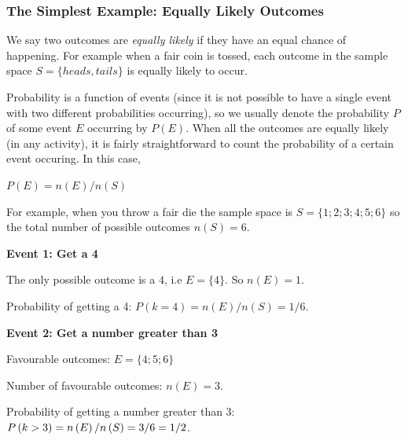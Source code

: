             \subsubsection{ The Simplest Example: Equally Likely Outcomes}
            \nopagebreak
         \label{m39377*eip-953}We say two outcomes are \textsl{equally likely} if they have an equal chance of
happening. For example when a fair coin is tossed, each outcome in the sample
space $S=\{heads,tails\}$ is equally likely to occur.\par \label{m39377*eip-594}Probability is a function of events (since it is not possible to have a single event with two different probabilities occurring), so we usually denote the probability $P$ of some event $E$ occurring by $P\left(E\right)$. When all the outcomes are equally likely (in any
activity), it is fairly straightforward to count the probability of a certain
event occuring. In this case,\par \label{m39377*eip-56}$P\left(E\right)=n\left(E\right)/n\left(S\right)$\par 
        \label{m39377*eip-525}For example, when you throw a fair die the sample
space is $S=\{1;2;3;4;5;6\}$ so the total number of possible outcomes $n\left(S\right)=6$.\par \label{m39377*id111979}\textbf{Event 1: Get a 4}
        \par 
        \label{m39377*id111985}The only possible outcome is a 
$4$, i.e $E=\{4\}$. So $n\left(E\right)=1$.
\par 
        \label{m39377*id111992}Probability of getting a 4: $P\left(k=4\right)=n\left(E\right)/n\left(S\right)=1/6$.\par 
        \label{m39377*id111998}\textbf{Event 2: Get a number greater than 3}
        \par 
        \label{m39377*id112007}Favourable outcomes: $E=\{4;5;6\}$\par 
        \label{m39377*id112039}Number of favourable outcomes: $n\left(E\right)=3$.\par 
        \label{m39377*id112045}Probability of getting a number greater than 3:
$P\left(k>{}3\right)=n\left(E\right)/n\left(S\right)=3/6=1/2$.\par 
\label{m39377*secfhsst!!!underscore!!!id319}\vspace{.5cm} 
      \noindent
